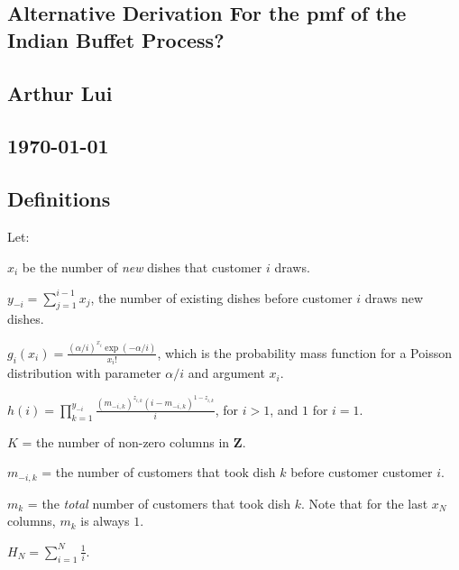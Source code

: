 \documentclass{article}
\def\prodl#1#2#3{\prod\limits_{#1=#2}^{#3}}
\def\suml#1#2#3{\sum\limits_{#1=#2}^{#3}}
\def\ds{\displaystyle}
\renewenvironment{itemize}[1]{\begin{compactitem}#1}{\end{compactitem}}
\begin{document}
                                                          
\begin{center}                                                            
  \section*{\textbf{Alternative Derivation For the pmf of the 
                    Indian Buffet Process?}}   %
  \subsection*{\textbf{Arthur Lui}}                                       
  \subsection*{\noindent\today}                                           
\end{center}                                                              


\subsection{Definitions}
\noindent
Let:
\begin{itemize}
  \item $x_i$ be the number of \textit{new} dishes that customer $i$ draws.\\ 
  \item $y_{-i} = \suml{j}{1}{i-1} x_j$, the number of existing dishes
        before customer $i$ draws new dishes.
  \item $g_i(x_i) = \ds\frac{(\alpha/i)^{x_i}\exp(-\alpha/i)}{x_i!}$, 
        which is the probability mass function for a Poisson distribution 
        with parameter $\alpha/i$ and argument $x_i$.\\
  \item $h(i) = \prodl{k}{1}{y_{-i}} 
        \frac{(m_{-i,k})^{z_{i,k}}(i-m_{-i,k})^{1-z_{i,k}}}{i}$, for $i>1$,
        and $1$ for $i=1$.
  \item $K$ = the number of non-zero columns in $\bm Z$.\\
  \item $m_{-i,k}$ = the number of customers that took dish $k$ before customer
        customer $i$.
  \item $m_k$ = the \textit{total} number of customers that took dish $k$. 
        Note that for the last $x_N$ columns, $m_k$ is always $1$.
  \item $H_N = \suml{i}{1}{N} \ds\frac{1}{i}$.
\end{itemize}
\end{document}
